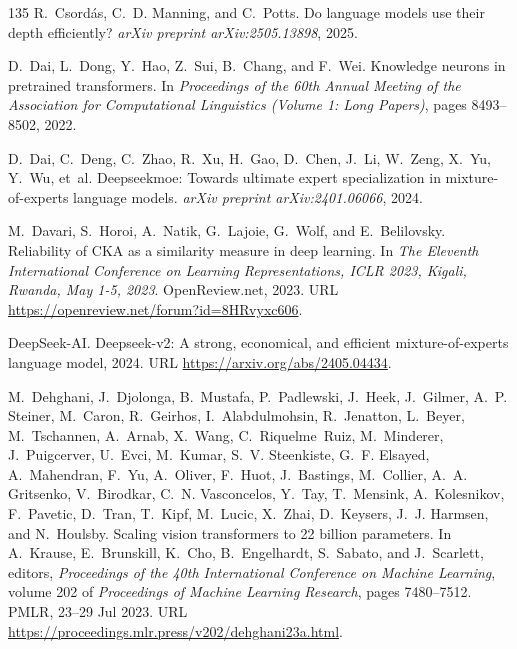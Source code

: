 \begin{thebibliography}{135}
R.~Csord{\'a}s, C.~D. Manning, and C.~Potts.
\newblock Do language models use their depth efficiently?
\newblock \emph{arXiv preprint arXiv:2505.13898}, 2025.

D.~Dai, L.~Dong, Y.~Hao, Z.~Sui, B.~Chang, and F.~Wei.
\newblock Knowledge neurons in pretrained transformers.
\newblock In \emph{Proceedings of the 60th Annual Meeting of the Association
  for Computational Linguistics (Volume 1: Long Papers)}, pages 8493--8502,
  2022.

D.~Dai, C.~Deng, C.~Zhao, R.~Xu, H.~Gao, D.~Chen, J.~Li, W.~Zeng, X.~Yu, Y.~Wu,
  et~al.
\newblock Deepseekmoe: Towards ultimate expert specialization in
  mixture-of-experts language models.
\newblock \emph{arXiv preprint arXiv:2401.06066}, 2024.

M.~Davari, S.~Horoi, A.~Natik, G.~Lajoie, G.~Wolf, and E.~Belilovsky.
\newblock Reliability of {CKA} as a similarity measure in deep learning.
\newblock In \emph{The Eleventh International Conference on Learning
  Representations, {ICLR} 2023, Kigali, Rwanda, May 1-5, 2023}. OpenReview.net,
  2023.
\newblock URL \url{https://openreview.net/forum?id=8HRvyxc606}.

DeepSeek-AI.
\newblock Deepseek-v2: A strong, economical, and efficient mixture-of-experts
  language model, 2024.
\newblock URL \url{https://arxiv.org/abs/2405.04434}.

M.~Dehghani, J.~Djolonga, B.~Mustafa, P.~Padlewski, J.~Heek, J.~Gilmer, A.~P.
  Steiner, M.~Caron, R.~Geirhos, I.~Alabdulmohsin, R.~Jenatton, L.~Beyer,
  M.~Tschannen, A.~Arnab, X.~Wang, C.~Riquelme~Ruiz, M.~Minderer,
  J.~Puigcerver, U.~Evci, M.~Kumar, S.~V. Steenkiste, G.~F. Elsayed,
  A.~Mahendran, F.~Yu, A.~Oliver, F.~Huot, J.~Bastings, M.~Collier, A.~A.
  Gritsenko, V.~Birodkar, C.~N. Vasconcelos, Y.~Tay, T.~Mensink, A.~Kolesnikov,
  F.~Pavetic, D.~Tran, T.~Kipf, M.~Lucic, X.~Zhai, D.~Keysers, J.~J. Harmsen,
  and N.~Houlsby.
\newblock Scaling vision transformers to 22 billion parameters.
\newblock In A.~Krause, E.~Brunskill, K.~Cho, B.~Engelhardt, S.~Sabato, and
  J.~Scarlett, editors, \emph{Proceedings of the 40th International Conference
  on Machine Learning}, volume 202 of \emph{Proceedings of Machine Learning
  Research}, pages 7480--7512. PMLR, 23--29 Jul 2023.
\newblock URL \url{https://proceedings.mlr.press/v202/dehghani23a.html}.


\end{thebibliography}
